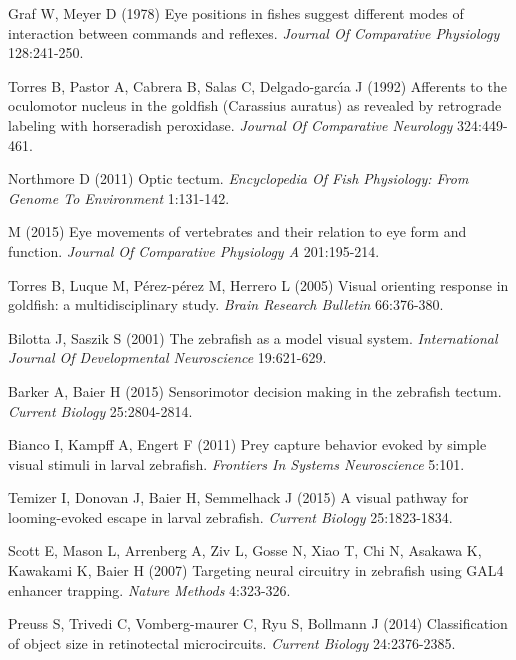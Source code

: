 \documentclass{ar-1col}
\begin{document}
{\begin{thebibliography}{00}
Graf W, Meyer D (1978) 
Eye positions in fishes suggest different modes of interaction between commands and reflexes.
\textit{ Journal Of Comparative Physiology} 128:241-250.

Torres B, Pastor A, Cabrera B, Salas C, Delgado-garc{\'\i}a J (1992) 
Afferents to the oculomotor nucleus in the goldfish (Carassius auratus) as revealed by retrograde labeling with horseradish peroxidase.
\textit{ Journal Of Comparative Neurology} 324:449-461.

Northmore D (2011) 
Optic tectum.
\textit{ Encyclopedia Of Fish Physiology: From Genome To Environment} 1:131-142.

 M (2015) 
Eye movements of vertebrates and their relation to eye form and function.
\textit{ Journal Of Comparative Physiology A} 201:195-214.

Torres B, Luque M, P{\'e}rez-p{\'e}rez M, Herrero L (2005) 
Visual orienting response in goldfish: a multidisciplinary study.
\textit{ Brain Research Bulletin} 66:376-380.

Bilotta J, Saszik S (2001) 
The zebrafish as a model visual system.
\textit{ International Journal Of Developmental Neuroscience} 19:621-629.

Barker A, Baier H (2015) 
Sensorimotor decision making in the zebrafish tectum.
\textit{ Current Biology} 25:2804-2814.

Bianco I, Kampff A, Engert F (2011) 
Prey capture behavior evoked by simple visual stimuli in larval zebrafish.
\textit{ Frontiers In Systems Neuroscience} 5:101.

Temizer I, Donovan J, Baier H, Semmelhack J (2015) 
A visual pathway for looming-evoked escape in larval zebrafish.
\textit{ Current Biology} 25:1823-1834.

Scott E, Mason L, Arrenberg A, Ziv L, Gosse N, Xiao T, Chi N, Asakawa K, Kawakami K, Baier H (2007) 
Targeting neural circuitry in zebrafish using GAL4 enhancer trapping.
\textit{ Nature Methods} 4:323-326.

Preuss S, Trivedi C, Vomberg-maurer C, Ryu S, Bollmann J (2014) 
Classification of object size in retinotectal microcircuits.
\textit{ Current Biology} 24:2376-2385.


\end{thebibliography}}
\end{document}
